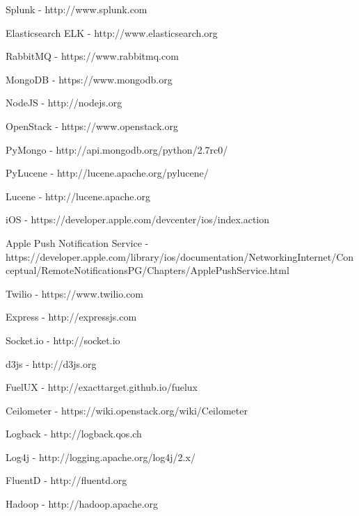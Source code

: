 \documentclass[10pt, a4paper, conference, compsocconf]{IEEEtran}
\begin{document}
%
%
%
\begin{thebibliography}{1}

    Splunk - http://www.splunk.com

    Elasticsearch ELK - http://www.elasticsearch.org

    RabbitMQ - https://www.rabbitmq.com

    MongoDB - https://www.mongodb.org

    NodeJS - http://nodejs.org

    OpenStack - https://www.openstack.org

    PyMongo - http://api.mongodb.org/python/2.7rc0/

    PyLucene - http://lucene.apache.org/pylucene/

    Lucene - http://lucene.apache.org

    iOS - https://developer.apple.com/devcenter/ios/index.action

    Apple Push Notification Service -
    https://developer.apple.com/library/ios/documentation/NetworkingInternet/Conceptual/RemoteNotificationsPG/Chapters/ApplePushService.html

    Twilio - https://www.twilio.com

    Express - http://expressjs.com

    Socket.io - http://socket.io

    d3js - http://d3js.org

    FuelUX - http://exacttarget.github.io/fuelux

    Ceilometer - https://wiki.openstack.org/wiki/Ceilometer

    Logback - http://logback.qos.ch

    Log4j - http://logging.apache.org/log4j/2.x/

    FluentD - http://fluentd.org

    Hadoop - http://hadoop.apache.org

\end{thebibliography}

\end{document}
